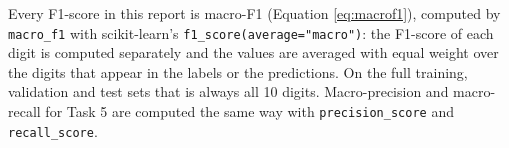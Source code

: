 Every F1-score in this report is macro-F1 (Equation \ref{eq:macrof1}),
computed by \texttt{macro\_f1} with scikit-learn's
\texttt{f1\_score(average="macro")}: the F1-score of each digit is
computed separately and the values are averaged with equal weight over
the digits that appear in the labels or the predictions. On the full
training, validation and test sets that is always all 10 digits.
Macro-precision and macro-recall for Task 5 are computed the
same way with \texttt{precision\_score} and \texttt{recall\_score}.


